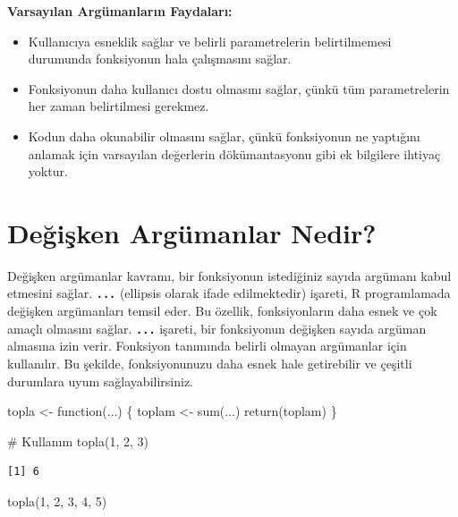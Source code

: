 \documentclass[
  letterpaper,
  DIV=11,
  numbers=noendperiod]{scrreprt}
\newenvironment{Shaded}{\begin{snugshade}}{\end{snugshade}}
\newcommand{\CommentTok}[1]{\textcolor[rgb]{0.37,0.37,0.37}{#1}}
\newcommand{\ControlFlowTok}[1]{\textcolor[rgb]{0.00,0.23,0.31}{#1}}
\newcommand{\DecValTok}[1]{\textcolor[rgb]{0.68,0.00,0.00}{#1}}
\newcommand{\FunctionTok}[1]{\textcolor[rgb]{0.28,0.35,0.67}{#1}}
\newcommand{\NormalTok}[1]{\textcolor[rgb]{0.00,0.23,0.31}{#1}}
\newcommand{\OtherTok}[1]{\textcolor[rgb]{0.00,0.23,0.31}{#1}}
\begin{document}
\textbf{Varsayılan Argümanların Faydaları:}

\begin{itemize}
\item
  Kullanıcıya esneklik sağlar ve belirli parametrelerin belirtilmemesi
  durumunda fonksiyonun hala çalışmasını sağlar.
\item
  Fonksiyonun daha kullanıcı dostu olmasını sağlar, çünkü tüm
  parametrelerin her zaman belirtilmesi gerekmez.
\item
  Kodun daha okunabilir olmasını sağlar, çünkü fonksiyonun ne yaptığını
  anlamak için varsayılan değerlerin dökümantasyonu gibi ek bilgilere
  ihtiyaç yoktur.
\end{itemize}

\section{Değişken Argümanlar
Nedir?}\label{deux11fiux15fken-arguxfcmanlar-nedir}

Değişken argümanlar kavramı, bir fonksiyonun istediğiniz sayıda argümanı
kabul etmesini sağlar. \textbf{\texttt{...}} (ellipsis olarak ifade
edilmektedir) işareti, R programlamada değişken argümanları temsil eder.
Bu özellik, fonksiyonların daha esnek ve çok amaçlı olmasını sağlar.
\textbf{\texttt{...}} işareti, bir fonksiyonun değişken sayıda argüman
almasına izin verir. Fonksiyon tanımında belirli olmayan argümanlar için
kullanılır. Bu şekilde, fonksiyonunuzu daha esnek hale getirebilir ve
çeşitli durumlara uyum sağlayabilirsiniz.

\begin{Shaded}
\begin{Highlighting}[]
\NormalTok{topla }\OtherTok{\textless{}{-}} \ControlFlowTok{function}\NormalTok{(...) \{}
\NormalTok{  toplam }\OtherTok{\textless{}{-}} \FunctionTok{sum}\NormalTok{(...)}
  \FunctionTok{return}\NormalTok{(toplam)}
\NormalTok{\}}

\CommentTok{\# Kullanım}
\FunctionTok{topla}\NormalTok{(}\DecValTok{1}\NormalTok{, }\DecValTok{2}\NormalTok{, }\DecValTok{3}\NormalTok{)}
\end{Highlighting}
\end{Shaded}

\begin{verbatim}
[1] 6
\end{verbatim}

\begin{Shaded}
\begin{Highlighting}[]
\FunctionTok{topla}\NormalTok{(}\DecValTok{1}\NormalTok{, }\DecValTok{2}\NormalTok{, }\DecValTok{3}\NormalTok{, }\DecValTok{4}\NormalTok{, }\DecValTok{5}\NormalTok{)}
\end{Highlighting}
\end{Shaded}
\end{document}
